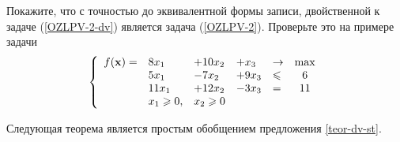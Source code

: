     \begin{exer}
    Покажите, что с точностью до эквивалентной формы записи,
    двойственной к задаче (\ref{OZLPV-2-dv}) является задача
    (\ref{OZLPV-2}). Проверьте это на примере задачи
    \begin{equation*}
\left\{
\begin{array}{lllllc}
f(\mathbf{x}) = & 8 x_1      & + 10 x_2  & +  x_3  &\to    & \max\\
            & 5 x_1      & -  7 x_2  & + 9 x_3 & \leqslant  & 6   \\
            & 11 x_1     & + 12 x_2  & - 3 x_3 & =     & 11  \\
            & x_1 \geqslant 0, & x_2 \geqslant 0 &&\\
\end{array} \right.
\end{equation*}
\end{exer}

    Следующая теорема является простым обобщением предложения
    \ref{teor-dv-st}.

